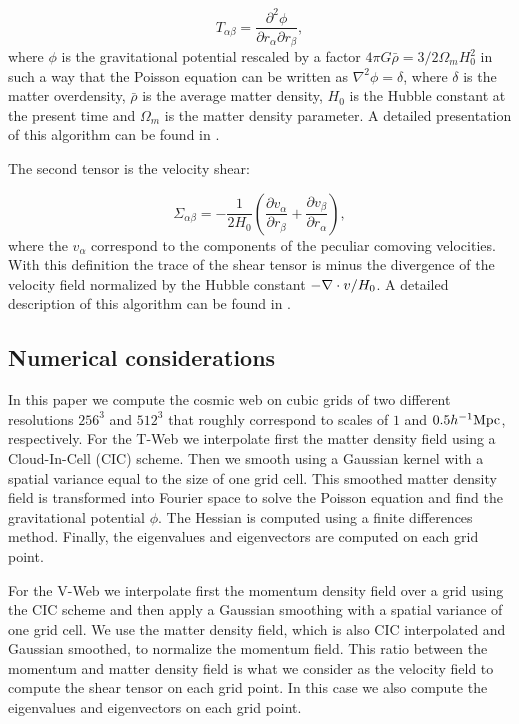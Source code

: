 \documentclass[useAMS,usenatbib]{mn2e}
\newcommand{\hMpc}{{\ifmmode{h^{-1}{\rm Mpc}}\else{$h^{-1}$Mpc }\fi}}
\begin{document}
\begin{equation}
T_{\alpha\beta} = \frac{\partial^2\phi}{\partial
  r_{\alpha}\partial r_{\beta}},
\end{equation}
%
where $\phi$ is the gravitational potential rescaled by a factor $4\pi
G\bar{\rho}=3/2\Omega_m H_{0}^2$ in such a way that the Poisson
equation can be written as $\nabla^{2}\phi  = \delta$, where $\delta$
is the matter overdensity, $\bar{\rho}$ is the average matter density,
$H_{0}$ is the Hubble constant at the present time and $\Omega_m$ is the
matter density parameter. A detailed presentation of this algorithm
can be found in \cite{Tweb}.

The second tensor is the velocity shear:

\begin{equation}
\Sigma_{\alpha\beta} = -\frac{1}{2H_{0}}\left(\frac{\partial
  v_{\alpha}}{\partial r_{\beta}}+ \frac{\partial v_{\beta}}{\partial
  r_{\alpha}}\right),
\end{equation}
%
where the $v_{\alpha}$ correspond to the components of the peculiar
comoving velocities. With this definition the trace of the shear
tensor is minus the divergence of the velocity field normalized by the
Hubble constant $-\nabla\cdot {\bf}v /H_{0}$. A detailed description
of this algorithm can be found in \cite{Vweb}.

\subsection{Numerical considerations}

In this paper we compute the cosmic web on cubic grids of two different
resolutions $256^3$ and $512^3$ that roughly correspond
to scales of $1$ and $0.5\hMpc$, respectively. For the T-Web we
interpolate first the matter density field using a Cloud-In-Cell (CIC)
scheme. Then we smooth using a Gaussian kernel with a spatial variance
equal to the size of one grid cell. This smoothed matter density field is
transformed into Fourier space to solve the Poisson equation and find
the gravitational potential $\phi$. The Hessian is computed using a finite
differences method. Finally, the eigenvalues and eigenvectors are
computed on each grid point.

For the V-Web we interpolate first the momentum density field over a
grid using the CIC scheme and then apply a Gaussian smoothing with a
spatial variance of one grid cell. We use the matter density field,
which is also CIC interpolated and Gaussian smoothed, to normalize the
momentum field. This ratio between the momentum and matter density
field is what we consider as the velocity field to compute the shear
tensor on each grid point. In this case we also compute the
eigenvalues and eigenvectors on each grid point.
\end{document}

